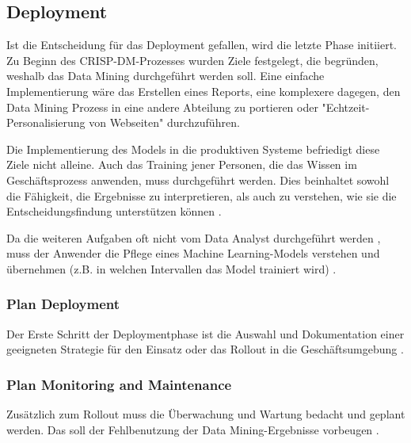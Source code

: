 \subsection{Deployment}
Ist die Entscheidung für das Deployment gefallen, wird die letzte Phase initiiert. Zu Beginn des CRISP-DM-Prozesses wurden Ziele festgelegt, die begründen, weshalb das Data Mining durchgeführt werden soll. 
Eine einfache Implementierung wäre das Erstellen eines Reports, eine komplexere dagegen, den Data Mining Prozess in eine andere Abteilung zu portieren \citep[Punkte 1.4.1.6.b und c]{larose_discovering_2014} oder "Echtzeit-Personalisierung von Webseiten" \citep[S.~18; eigene Übersetzung]{shearer_crisp-dm_2000} durchzuführen.\par
Die Implementierung des Models in die produktiven Systeme befriedigt diese Ziele nicht alleine. Auch das Training jener Personen, die das Wissen im Geschäftsprozess anwenden, muss durchgeführt werden. Dies beinhaltet sowohl die Fähigkeit, die Ergebnisse zu interpretieren, als auch zu verstehen, wie sie die Entscheidungsfindung unterstützen können \citep[S.~73]{swamynathan_mastering_2017}. \par
Da die weiteren Aufgaben oft nicht vom Data Analyst durchgeführt werden \citep[Punkt 1.4.1.6.d]{larose_discovering_2014}, muss der Anwender die Pflege eines Machine Learning-Models verstehen und übernehmen (z.B. in welchen Intervallen das Model trainiert wird) \citep[S.~74]{swamynathan_mastering_2017}.

\subsubsection{Plan Deployment}
Der Erste Schritt der Deploymentphase ist die Auswahl und Dokumentation einer geeigneten Strategie für den Einsatz oder das Rollout in die Geschäftsumgebung .

\subsubsection{Plan Monitoring and Maintenance}
Zusätzlich zum Rollout muss die Überwachung und Wartung bedacht und geplant werden. Das soll der Fehlbenutzung der Data Mining-Ergebnisse vorbeugen .

